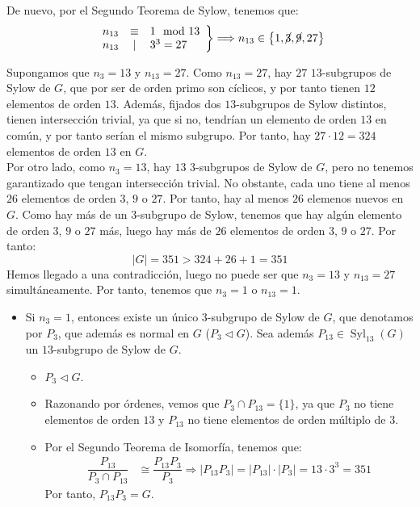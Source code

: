 \documentclass[12pt]{article}
\DeclareMathOperator{\Syl}{Syl}
\begin{document}
\begin{ejercicio}
\begin{enumerate}
            De nuevo, por el Segundo Teorema de Sylow, tenemos que:
            \begin{equation*}
                \left.\begin{array}{rcl}
                    n_{13} & \equiv & 1 \mod 13 \\
                    n_{13} & \mid & 3^3=27
                \end{array}\right\}
                \Longrightarrow n_{13} \in \left\{1,\cancel{3},\cancel{9},27\right\}
            \end{equation*}

            Supongamos que $n_3=13$ y $n_{13}=27$. Como $n_{13}=27$, hay $27$ $13$-subgrupos de Sylow de $G$, que por ser de orden primo son cíclicos, y por tanto tienen $12$ elementos de orden $13$. Además, fijados dos $13$-subgrupos de Sylow distintos, tienen intersección trivial, ya que si no, tendrían un elemento de orden $13$ en común, y por tanto serían el mismo subgrupo. Por tanto, hay $27\cdot 12=324$ elementos de orden $13$ en $G$.\\


            Por otro lado, como $n_3=13$, hay $13$ $3$-subgrupos de Sylow de $G$, pero no tenemos garantizado que tengan intersección trivial. No obstante, cada uno tiene al menos $26$ elementos de orden $3$, $9$ o $27$. Por tanto, hay al menos $26$ elemenos nuevos en $G$. Como hay más de un $3$-subgrupo de Sylow, tenemos que hay algún elemento de orden $3$, $9$ o $27$ más, luego hay más de $26$ elementos de orden $3$, $9$ o $27$. Por tanto:
            \begin{equation*}
                |G| = 351 > 324 + 26 + 1 = 351
            \end{equation*}
            Hemos llegado a una contradicción, luego no puede ser que $n_3=13$ y $n_{13}=27$ simultáneamente. Por tanto, tenemos que $n_3=1$ o $n_{13}=1$.
            \begin{itemize}
                \item Si $n_3=1$, entonces existe un único $3$-subgrupo de Sylow de $G$, que denotamos por $P_3$, que además es normal en $G$ ($P_3 \lhd G$). Sea además $P_13\in \Syl_{13}(G)$ un $13$-subgrupo de Sylow de $G$.
                \begin{itemize}
                    \item $P_{3}\lhd G$.
                    \item Razonando por órdenes, vemos que $P_3\cap P_{13}=\{1\}$, ya que $P_3$ no tiene elementos de orden $13$ y $P_{13}$ no tiene elementos de orden múltiplo de $3$.
                    \item Por el Segundo Teorema de Isomorfía, tenemos que:
                    \begin{align*}
                        \dfrac{P_{13}}{P_{3}\cap P_{13}} & \cong \dfrac{P_{13}P_3}{P_3} \Longrightarrow |P_{13}P_3| = |P_{13}|\cdot |P_3| = 13\cdot 3^3 = 351
                    \end{align*}
                    Por tanto, $P_{13}P_3=G$.
                \end{itemize}


\end{itemize}
\end{enumerate}
\end{ejercicio}
\end{document}

